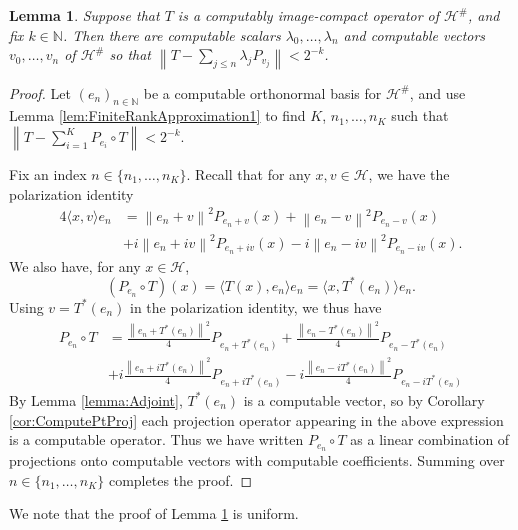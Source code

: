 \documentclass{amsart}
\newcommand{\norm}[1]{\left\| #1 \right\|}
\theoremstyle{plain}
\newtheorem{lemma}[theorem]{Lemma}
\theoremstyle{definition}
\numberwithin{equation}{section}
\begin{document}
\begin{lemma}\label{lem:FiniteRankApproximation2}
Suppose that $T$ is a computably image-compact operator of $\mathcal{H}^\#$, and fix $k \in \mathbb{N}$.  Then there are computable scalars $\lambda_0, \ldots, \lambda_n$ and computable vectors $v_0, \ldots, v_n$ of $\mathcal{H}^\#$ so that $\norm{T - \sum_{j \leq n}\lambda_jP_{v_j}} < 2^{-k}$.
\end{lemma}
\begin{proof}
Let $(e_n)_{n \in \mathbb{N}}$ be a computable orthonormal basis for $\mathcal{H}^\#$, and use Lemma \ref{lem:FiniteRankApproximation1} to find $K$, $n_1, \ldots, n_K$ such that $\norm{T - \sum_{i=1}^KP_{e_i}\circ T} < 2^{-k}$.

Fix an index $n \in \{n_1, \ldots, n_K\}$.  Recall that for any $x, v \in \mathcal{H}$, we have the polarization identity
\begin{align*}
4\langle x, v \rangle e_n &= \norm{e_n+v}^2P_{e_n+v}(x) + \norm{e_n-v}^2P_{e_n-v}(x) \\ &+  i\norm{e_n+iv}^2P_{e_n+iv}(x) - i\norm{e_n-iv}^2P_{e_n-iv}(x).
\end{align*}
We also have, for any $x \in \mathcal{H}$,
\[(P_{e_n} \circ T)(x) = \langle T(x), e_n \rangle e_n = \langle x, T^*(e_n)\rangle e_n.\]
Using $v = T^*(e_n)$ in the polarization identity, we thus have
\begin{align*}
P_{e_n} \circ T &= \frac{\norm{e_n+T^*(e_n)}^2}{4}P_{e_n+T^*(e_n)} + \frac{\norm{e_n-T^*(e_n)}^2}{4}P_{e_n-T^*(e_n)}\\&+i\frac{\norm{e_n+iT^*(e_n)}^2}{4}P_{e_n+iT^*(e_n)}-i\frac{\norm{e_n-iT^*(e_n)}^2}{4}P_{e_n-iT^*(e_n)}
\end{align*}
By Lemma \ref{lemma:Adjoint}, $T^*(e_n)$ is a computable vector, so by Corollary \ref{cor:ComputePtProj} each projection operator appearing in the above expression is a computable operator. Thus we have written $P_{e_n}\circ T$ as a linear combination of projections onto computable vectors with computable coefficients.  Summing over $n \in \{n_1, \ldots, n_K\}$ completes the proof.
\end{proof}

We note that the proof of Lemma \ref{lem:FiniteRankApproximation2} is uniform.
\end{document}
